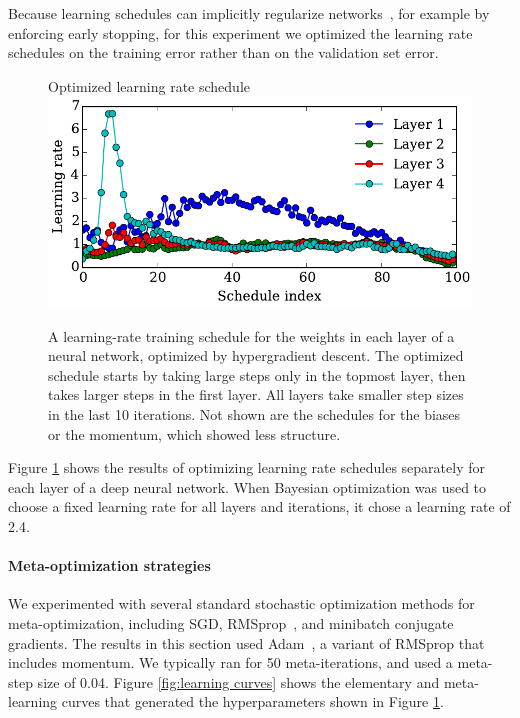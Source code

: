 \documentclass{article}
\newcommand{\primal}{elementary}
\begin{document}
Because learning schedules can implicitly regularize networks~\cite{erhan2010does}, for example by enforcing early stopping, for this experiment we optimized the learning rate schedules on the training error rather than on the validation set error.
%
\begin{figure}[h]
\vskip 0.1in
\begin{center}
Optimized learning rate schedule \\
\includegraphics[width=\columnwidth]{../experiments/Feb_3_training_schedules/3_adam_50/schedules_small.pdf}
\vskip -0.1in
\caption{A learning-rate training schedule for the weights in each layer of a neural network, optimized by hypergradient descent.
The optimized schedule starts by taking large steps only in the topmost layer, then takes larger steps in the first layer.
All layers take smaller step sizes in the last 10 iterations.
Not shown are the schedules for the biases or the momentum, which showed less structure.}
\label{fig:optimal schedule}
\end{center}
\vskip -0.1in
\end{figure} 
%
Figure \ref{fig:optimal schedule} shows the results of optimizing learning rate schedules separately for each layer of a deep neural network.
When Bayesian optimization was used to choose a fixed learning rate for all layers and iterations, it chose a learning rate of 2.4.

\paragraph{Meta-optimization strategies}
We experimented with several standard stochastic optimization methods for meta-optimization, including SGD, RMSprop~\citep{Tieleman2012}, and minibatch conjugate gradients.
The results in this section used Adam~\citep{Adam14}, a variant of RMSprop that includes momentum.
We typically ran for 50 meta-iterations, and used a meta-step size of 0.04.
Figure \ref{fig:learning curves} shows the \primal{} and meta-learning curves that generated the hyperparameters shown in Figure \ref{fig:optimal schedule}.
\end{document}
